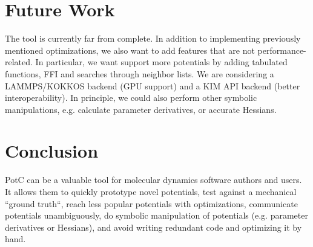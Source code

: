 \documentclass[sigconf]{acmart}
\begin{document}
\section{Future Work}
The tool is currently far from complete.
In addition to implementing previously mentioned optimizations, we also want to add features that are not performance-related.
In particular, we want support more potentials by adding tabulated functions, FFI and searches through neighbor lists.
We are considering a LAMMPS/KOKKOS backend (GPU support) and a KIM API backend (better interoperability).
In principle, we could also perform other symbolic manipulations, e.g. calculate parameter derivatives, or accurate Hessians.

\section{Conclusion}
PotC can be a valuable tool for molecular dynamics software authors and users.
It allows them to quickly prototype novel potentials, test against a mechanical ``ground truth``, reach less popular potentials with optimizations, communicate potentials unambiguously, do symbolic manipulation of potentials (e.g. parameter derivatives or Hessians), and avoid writing redundant code and optimizing it by hand.

%
%
%
\end{document}

